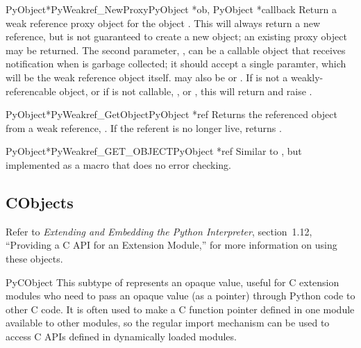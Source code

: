 \begin{cfuncdesc}{PyObject*}{PyWeakref_NewProxy}{PyObject *ob,
                                                 PyObject *callback}
  Return a weak reference proxy object for the object .  This
  will always return a new reference, but is not guaranteed to create
  a new object; an existing proxy object may be returned.  The second
  parameter, , can be a callable object that receives
  notification when  is garbage collected; it should accept a
  single paramter, which will be the weak reference object itself.
   may also be  or \NULL.  If  is not
  a weakly-referencable object, or if  is not callable,
  , or \NULL, this will return \NULL{} and raise
  .
\end{cfuncdesc}

\begin{cfuncdesc}{PyObject*}{PyWeakref_GetObject}{PyObject *ref}
  Returns the referenced object from a weak reference, .  If
  the referent is no longer live, returns \NULL.
\end{cfuncdesc}

\begin{cfuncdesc}{PyObject*}{PyWeakref_GET_OBJECT}{PyObject *ref}
  Similar to , but implemented as a
  macro that does no error checking.
\end{cfuncdesc}


\subsection{CObjects \label{cObjects}}

Refer to \emph{Extending and Embedding the Python Interpreter},
section~1.12, ``Providing a C API for an Extension Module,'' for more
information on using these objects.


\begin{ctypedesc}{PyCObject}
  This subtype of  represents an opaque value, useful
  for C extension modules who need to pass an opaque value (as a
   pointer) through Python code to other C code.  It is
  often used to make a C function pointer defined in one module
  available to other modules, so the regular import mechanism can be
  used to access C APIs defined in dynamically loaded modules.
\end{ctypedesc}

